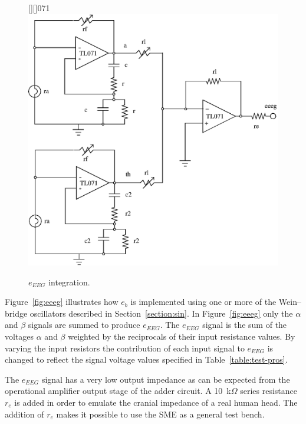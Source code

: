 \begin{figure}[htbp]
	\begin{center}
	[][]{071}
	\psfrag{+}{+}
	\psfrag{-}{--}
	\psfrag{+}{+}
	\includegraphics[width=\textwidth]{eeeg.eps}
    \caption{$e_{EEG}$ integration.}
    \label{fig:eeeg}
	\end{center}
\end{figure}

Figure~\vref{fig:eeeg} illustrates how $e_b$ is implemented using one
or more of the Wein--bridge oscillators described in
Section~\ref{section:sin}. In Figure~\vref{fig:eeeg} only the $\alpha$
and $\beta$ signals are summed to produce $e_{EEG}$. The $e_{EEG}$
signal is the sum of the voltages $\alpha$ and $\beta$ weighted by the
reciprocals of their input resistance values. By varying the input
resistors the contribution of each input signal to $e_{EEG}$ is
changed to reflect the signal voltage values specified in
Table~\vref{table:test-pros}.



The $e_{EEG}$ signal has a very low output impedance as can be
expected from the operational amplifier output stage of the adder
circuit. A 10~k$\Omega$ series resistance $r_e$ is added in order to
emulate the cranial impedance of a real human head. The addition of
$r_e$ makes it possible to use the SME as a general test bench. 

